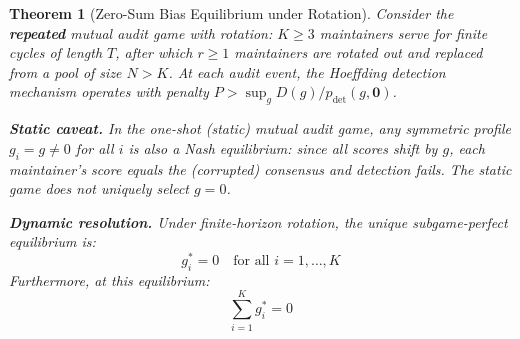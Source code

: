 \documentclass[12pt,a4paper]{article}
\newtheorem{theorem}{Theorem}[section]
\theoremstyle{remark}
\begin{document}
\begin{theorem}[Zero-Sum Bias Equilibrium under Rotation]\label{thm:zerosumbias}
Consider the \textbf{repeated} mutual audit game with rotation: $K \geq 3$
maintainers serve for finite cycles of length $T$, after which $r \geq 1$
maintainers are rotated out and replaced from a pool of size $N > K$.
At each audit event, the Hoeffding detection mechanism operates with
penalty $P > \sup_{g} D(g) / p_{\text{det}}(g, \mathbf{0})$.

\textbf{Static caveat.} In the one-shot (static) mutual audit game,
any symmetric profile $g_i = g \neq 0$ for all $i$ is also a Nash equilibrium:
since all scores shift by $g$, each maintainer's score equals the (corrupted)
consensus and detection fails. The static game does \textit{not} uniquely
select $g=0$.

\textbf{Dynamic resolution.} Under finite-horizon rotation, the unique
subgame-perfect equilibrium is:
\begin{equation}\label{eq:nasheq}
    g_i^* = 0 \quad \text{for all } i = 1, \ldots, K
\end{equation}
Furthermore, at this equilibrium:
\begin{equation}
    \sum_{i=1}^{K} g_i^* = 0
\end{equation}
\end{theorem}
\end{document}
